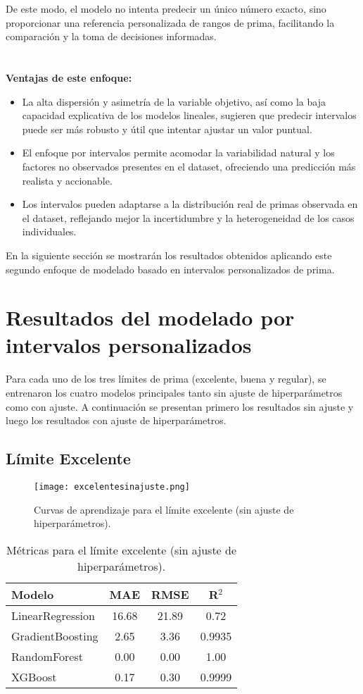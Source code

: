 \documentclass[12pt,a4paper]{article}
\begin{document}
\begin{itemize}
De este modo, el modelo no intenta predecir un único número exacto, sino proporcionar una referencia personalizada de rangos de prima, facilitando la comparación y la toma de decisiones informadas.
\\
\\
\\
\textbf{Ventajas de este enfoque:}
\begin{itemize}
    \item La alta dispersión y asimetría de la variable objetivo, así como la baja capacidad explicativa de los modelos lineales, sugieren que predecir intervalos puede ser más robusto y útil que intentar ajustar un valor puntual.
    \item El enfoque por intervalos permite acomodar la variabilidad natural y los factores no observados presentes en el dataset, ofreciendo una predicción más realista y accionable.
    \item Los intervalos pueden adaptarse a la distribución real de primas observada en el dataset, reflejando mejor la incertidumbre y la heterogeneidad de los casos individuales.
\end{itemize}

En la siguiente sección se mostrarán los resultados obtenidos aplicando este segundo enfoque de modelado basado en intervalos personalizados de prima.

\section*{Resultados del modelado por intervalos personalizados}

Para cada uno de los tres límites de prima (excelente, buena y regular), se entrenaron los cuatro modelos principales tanto sin ajuste de hiperparámetros como con ajuste. A continuación se presentan primero los resultados sin ajuste y luego los resultados con ajuste de hiperparámetros.

\subsection*{Límite Excelente}
\begin{figure}[H]
    \centering
    \texttt{[image: excelentesinajuste.png]}
    \caption{Curvas de aprendizaje para el límite excelente (sin ajuste de hiperparámetros).}
\end{figure}
\begin{table}[H]
\centering
\begin{tabular}{lccc}
\toprule
\textbf{Modelo} & \textbf{MAE} & \textbf{RMSE} & \textbf{R$^2$} \\
\midrule
LinearRegression & 16.68 & 21.89 & 0.72 \\
GradientBoosting & 2.65 & 3.36 & 0.9935 \\
RandomForest & 0.00 & 0.00 & 1.00 \\
XGBoost & 0.17 & 0.30 & 0.9999 \\
\bottomrule
\end{tabular}
\caption{Métricas para el límite excelente (sin ajuste de hiperparámetros).}
\end{table}


\end{itemize}
\end{document}
